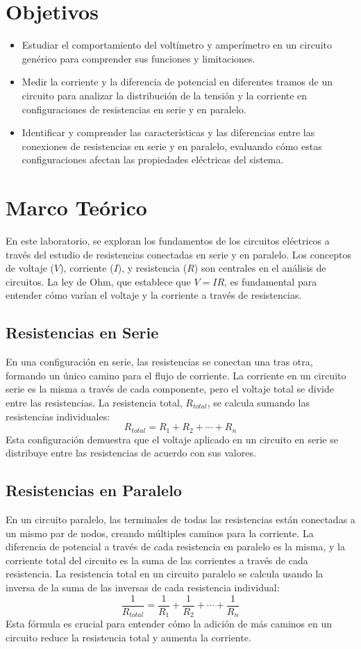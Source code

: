 \section{Objetivos}
\begin{itemize}
    \item Estudiar el comportamiento del voltímetro y amperímetro en un circuito genérico para comprender sus funciones y limitaciones.
    \item Medir la corriente y la diferencia de potencial en diferentes tramos de un circuito para analizar la distribución de la tensión y la corriente en configuraciones de resistencias en serie y en paralelo.
    \item Identificar y comprender las características y las diferencias entre las conexiones de resistencias en serie y en paralelo, evaluando cómo estas configuraciones afectan las propiedades eléctricas del sistema.
\end{itemize}

\section{Marco Teórico}
En este laboratorio, se exploran los fundamentos de los circuitos eléctricos a través del estudio de resistencias conectadas en serie y en paralelo. Los conceptos de voltaje (\( V \)), corriente (\( I \)), y resistencia (\( R \)) son centrales en el análisis de circuitos. La ley de Ohm, que establece que \( V = IR \), es fundamental para entender cómo varían el voltaje y la corriente a través de resistencias.

\subsection{Resistencias en Serie}
En una configuración en serie, las resistencias se conectan una tras otra, formando un único camino para el flujo de corriente. La corriente en un circuito serie es la misma a través de cada componente, pero el voltaje total se divide entre las resistencias. La resistencia total, \( R_{total} \), se calcula sumando las resistencias individuales:
\[
R_{total} = R_1 + R_2 + \cdots + R_n
\]
Esta configuración demuestra que el voltaje aplicado en un circuito en serie se distribuye entre las resistencias de acuerdo con sus valores.

\subsection{Resistencias en Paralelo}
En un circuito paralelo, las terminales de todas las resistencias están conectadas a un mismo par de nodos, creando múltiples caminos para la corriente. La diferencia de potencial a través de cada resistencia en paralelo es la misma, y la corriente total del circuito es la suma de las corrientes a través de cada resistencia. La resistencia total en un circuito paralelo se calcula usando la inversa de la suma de las inversas de cada resistencia individual:
\[
\frac{1}{R_{total}} = \frac{1}{R_1} + \frac{1}{R_2} + \cdots + \frac{1}{R_n}
\]
Esta fórmula es crucial para entender cómo la adición de más caminos en un circuito reduce la resistencia total y aumenta la corriente.

